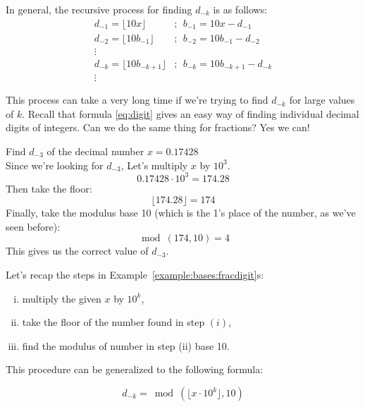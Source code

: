 In general, the recursive process for finding $d_{-k}$ is as follows:
\begin{equation}\label{eq:recursFrac}
\begin{aligned}
d_{-1}=\lfloor 10x\rfloor&;~~ b_{-1}=10x - d_{-1}\\
d_{-2}=\lfloor 10b_{-1}\rfloor&;~~ b_{-2}=10b_{-1} - d_{-2}\\
\vdots \\
d_{-k}=\lfloor 10b_{-k+1}\rfloor&;~~ b_{-k}=10b_{-k+1} - d_{-k}\\
\vdots
\end{aligned}
\end{equation}

This process can take a very long time if we're trying to find $d_{-k}$ for large values of $k$. Recall that formula \eqref{eq:digit} gives an easy way of finding individual decimal digits of integers. Can we do the same thing for fractions? Yes we can!

\begin{example}\label{example:bases:fracdigit}
Find $d_{-3}$ of the decimal number $x=0.17428$\\
Since we're looking for $d_{-3}$, Let's multiply $x$ by $10^3$.\\
\begin{equation*}
0.17428\cdot 10^3=174.28
\end{equation*}
Then take the floor:
\begin{equation*}
\lfloor 174.28 \rfloor = 174
\end{equation*} 
Finally, take the modulus base 10 (which is the 1's place of the number, as we've seen before):
\begin{equation*}
\bmod(174,10)=4
\end{equation*}
 This gives us the correct value of $d_{-3}$.
\end{example}

Let's recap the steps in Example~\ref{example:bases:fracdigit}s:
\begin{enumerate}[(i)]
\item multiply the given $x$ by $10^k$,
\item take the floor of the number found in step $(i)$,
\item find the modulus of number in step (ii) base 10.
\end{enumerate}
This procedure can be generalized to the following formula:

\begin{equation}\label{eq:decdig}
d_{-k}=\bmod(\lfloor x\cdot 10^k\rfloor,10)
\end{equation}

